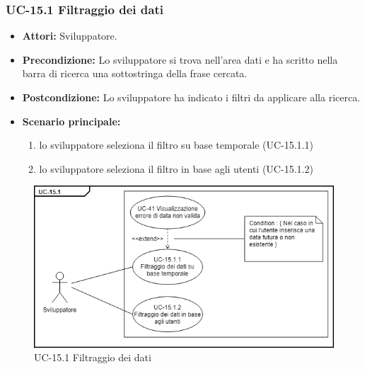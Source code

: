 	\subsubsection{UC-15.1 Filtraggio dei dati}	
		\begin{itemize}
			\item \textbf{Attori:} Sviluppatore.
			\item \textbf{Precondizione:} Lo sviluppatore si trova nell'area dati e ha scritto nella barra di ricerca una sottostringa della frase cercata.
			\item \textbf{Postcondizione:} Lo sviluppatore ha indicato i filtri da applicare alla ricerca.
			\item \textbf{Scenario principale:}
				\begin{enumerate}
					\item lo sviluppatore seleziona il filtro su base temporale (UC-15.1.1)
					\item lo sviluppatore seleziona il filtro in base agli utenti (UC-15.1.2)
				\end{enumerate}
			\end{itemize}
	\begin{figure}[h]
			\centering
			\includegraphics[scale=0.7]{images/UC-15_1.png}
			\caption{UC-15.1 Filtraggio dei dati}
		\end{figure}	
	
